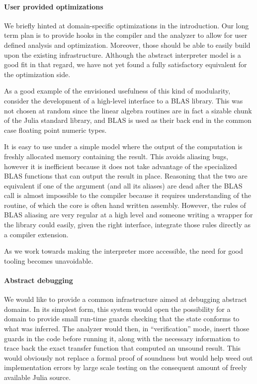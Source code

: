 \documentclass[11pt]{article}
\begin{document}
\paragraph{User provided optimizations} We briefly hinted at domain-specific optimizations in the introduction.
Our long term plan is to provide hooks in the compiler and the analyzer to allow for user defined analysis and optimization.
Moreover, those should be able to easily build upon the existing infrastructure.
Although the abstract interpreter model is a good fit in that regard, we have not yet found a fully satisfactory equivalent for the optimization side.

As a good example of the envisioned usefulness of this kind of modularity, consider the development of a high-level interface to a BLAS library.
This was not chosen at random since the linear algebra routines are in fact a sizable chunk of the Julia standard library, and BLAS is used as their back end in the common case floating point numeric types.

It is easy to use under a simple model where the output of the computation is freshly allocated memory containing the result. This avoids aliasing bugs, however it is inefficient because it does not take advantage of the specialized BLAS functions that can output the result in place. Reasoning that the two are equivalent if one of the argument (and all its aliases) are dead after the BLAS call is almost impossible to the compiler because it requires understanding of the routine, of which the core is often hand written assembly.
However, the rules of BLAS aliasing are very regular at a high level and someone writing a wrapper for the library could easily, given the right interface, integrate those rules directly as a compiler extension.

As we work towards making the interpreter more accessible, the need for good tooling becomes unavoidable.

\paragraph{Abstract debugging} We would like to provide a common infrastructure aimed at debugging abstract domains.
In its simplest form, this system would open the possibility for a domain to provide small run-time guards checking that the state conforms to what was inferred.
The analyzer would then, in ``verification'' mode, insert those guards in the code before running it, along with the necessary information to trace back the exact transfer function that computed an unsound result.
This would obviously not replace a formal proof of soundness but would help weed out implementation errors by large scale testing on the consequent amount of freely available Julia source.
\end{document}
